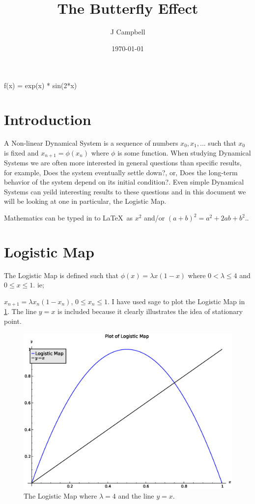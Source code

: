 \documentclass[a4paper]{article}
\title{The Butterfly Effect}
\author{J Campbell}
\date{\today}
\begin{document}

\maketitle
\begin{sageblock}
    f(x) = exp(x) * sin(2*x)
\end{sageblock}

\section{Introduction}
A Non-linear Dynamical System is a sequence of numbers $x_0, x_1, ...$ such that $x_0$ is fixed and $x_{n+1} = \phi(x_n)$ where $\phi$ is some function. When studying Dynamical Systems we are often more interested in general questions than specific results, for example, Does the system eventually settle down?, or, Does the long-term behavior of the system depend on its initial condition?. Even simple Dynamical Systems can yeild interesting results to these questions and in this document we will be looking at one in particular, the Logistic Map.

Mathematics can be typed in to \LaTeX\ as $x^2$ and/or \((a+b)^2=a^2+2ab+b^2\)..


\section{Logistic Map}
The Logistic Map is defined such that $\phi(x)=\lambda x(1-x)$ where $ 0 <\lambda \leq 4$ and $0\leq x\leq 1$. ie;

$x_{n+1} = \lambda x_n(1-x_n)$, $0 \leq x_n \leq 1 $. I have used sage to plot the Logistic Map in \ref{logisticmap}. The line $y=x$ is included because it clearly illustrates the idea of stationary point.
\begin{figure}[htdp]
\begin{center}
\includegraphics[scale=0.4]{logisticmap}
\end{center}
\caption{The Logistic Map where $\lambda = 4$ and the line $y = x$.}
\label{logisticmap}
\end{figure}
\end{document}

